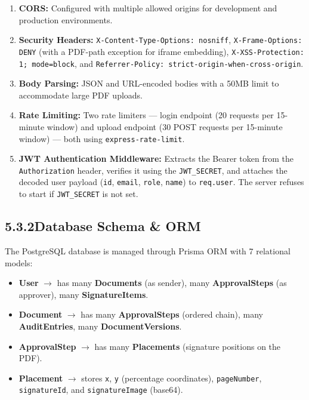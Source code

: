 \documentclass[12pt,a4paper]{report}
\newcommand{\citeref}[1]{%
  \textcolor{citeborder}{%
    \fboxsep=2pt%
    \fcolorbox{citeborder}{citebg}{\footnotesize\bfseries[#1]}%
  }%
}
\begin{document}
\begin{enumerate}
    \item \textbf{CORS:} Configured with multiple allowed origins for development and production environments.
    \item \textbf{Security Headers:} \texttt{X-Content-Type-Options: nosniff}, \texttt{X-Frame-Options: DENY} (with a PDF-path exception for iframe embedding), \texttt{X-XSS-Protection: 1; mode=block}, and \texttt{Referrer-Policy: strict-origin-when-cross-origin}.
    \item \textbf{Body Parsing:} JSON and URL-encoded bodies with a 50MB limit to accommodate large PDF uploads.
    \item \textbf{Rate Limiting:} Two rate limiters --- login endpoint (20 requests per 15-minute window) and upload endpoint (30 POST requests per 15-minute window) --- both using \texttt{express-rate-limit}.
    \item \textbf{JWT Authentication Middleware:} Extracts the Bearer token from the \texttt{Authorization} header, verifies it using the \texttt{JWT\_SECRET}, and attaches the decoded user payload (\texttt{id}, \texttt{email}, \texttt{role}, \texttt{name}) to \texttt{req.user}. The server refuses to start if \texttt{JWT\_SECRET} is not set.
\end{enumerate}

\subsection*{5.3.2\quad Database Schema \& ORM}

The PostgreSQL database is managed through Prisma ORM \citeref{3} with 7 relational models:

\begin{itemize}
    \item \textbf{User} $\rightarrow$ has many \textbf{Documents} (as sender), many \textbf{ApprovalSteps} (as approver), many \textbf{SignatureItems}.
    \item \textbf{Document} $\rightarrow$ has many \textbf{ApprovalSteps} (ordered chain), many \textbf{AuditEntries}, many \textbf{DocumentVersions}.
    \item \textbf{ApprovalStep} $\rightarrow$ has many \textbf{Placements} (signature positions on the PDF).
    \item \textbf{Placement} $\rightarrow$ stores \texttt{x}, \texttt{y} (percentage coordinates), \texttt{pageNumber}, \texttt{signatureId}, and \texttt{signatureImage} (base64).
\end{itemize}
\end{document}
